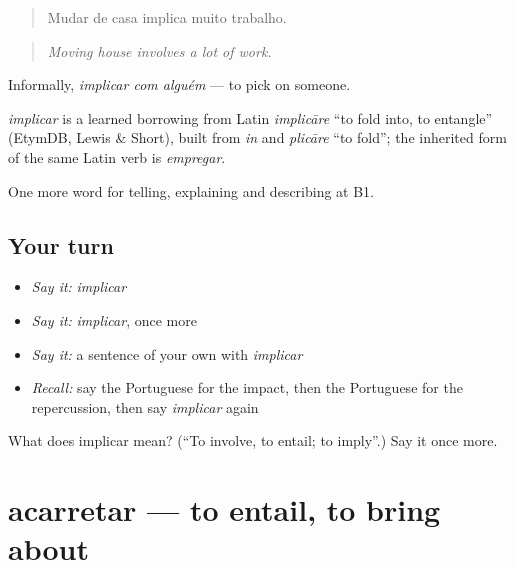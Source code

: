 \begin{quote}
Mudar de casa implica muito trabalho.
\end{quote}

\begin{quote}
\emph{Moving house involves a lot of work.}
\end{quote}

Informally, \emph{implicar com alguém} — to pick on someone.

\begin{cousinweb}
\emph{implicar} is a learned borrowing from Latin \emph{implicāre} \textquotedblleft{}to fold into, to entangle\textquotedblright{} (EtymDB, Lewis \& Short), built from \emph{in} and \emph{plicāre} \textquotedblleft{}to fold\textquotedblright{}; the inherited form of the same Latin verb is \emph{empregar}.
\end{cousinweb}

\begin{grammarlens}[title={What you've built}]
One more word for telling, explaining and describing at B1.
\end{grammarlens}

\subsection*{Your turn}
\begin{itemize}
\raggedright
  \item \emph{Say it:} \emph{implicar}
  \item \emph{Say it:} \emph{implicar}, once more
  \item \emph{Say it:} a sentence of your own with \emph{implicar}
  \item \emph{Recall:} say the Portuguese for the impact, then the Portuguese for the repercussion, then say \emph{implicar} again
\end{itemize}

\begin{tcolorbox}[breakable,colback=teal!4,colframe=teal!35!black,title={Before you move on}]
What does implicar mean? (\textquotedblleft{}To involve, to entail; to imply\textquotedblright{}.) Say it once more.
\end{tcolorbox}
\section[acarretar]{acarretar — to entail, to bring about}

\label{lesson:PT-C351-acarretar}



